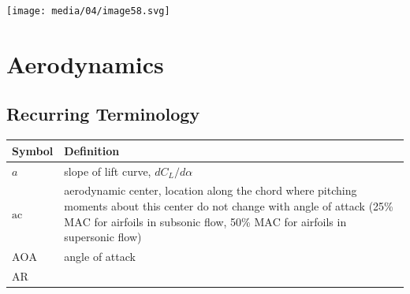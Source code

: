 \documentclass[
]{book}
\begin{document}
\texttt{[image: media/04/image58.svg]}

\hypertarget{aerodynamics}{%
\chapter{Aerodynamics}\label{aerodynamics}}

\hypertarget{recurring-terminology}{%
\section*{Recurring Terminology}\label{recurring-terminology}}

\begin{longtable}[]{@{}ll@{}}
\toprule
\begin{minipage}[b]{0.22\columnwidth}\raggedright
Symbol\strut
\end{minipage} & \begin{minipage}[b]{0.72\columnwidth}\raggedright
Definition\strut
\end{minipage}\tabularnewline
\midrule
\endhead
\begin{minipage}[t]{0.22\columnwidth}\raggedright
\(a\)\strut
\end{minipage} & \begin{minipage}[t]{0.72\columnwidth}\raggedright
slope of lift curve, \(dC_L/d\alpha\)\strut
\end{minipage}\tabularnewline
\begin{minipage}[t]{0.22\columnwidth}\raggedright
\(\mathrm{ac}\)\strut
\end{minipage} & \begin{minipage}[t]{0.72\columnwidth}\raggedright
aerodynamic center, location along the chord where pitching moments about this center do not change with angle of attack (25\% \(\mathrm{MAC}\) for airfoils in subsonic flow, 50\% \(\mathrm{MAC}\) for airfoils in supersonic flow)\strut
\end{minipage}\tabularnewline
\begin{minipage}[t]{0.22\columnwidth}\raggedright
\(\mathrm{AOA}\)\strut
\end{minipage} & \begin{minipage}[t]{0.72\columnwidth}\raggedright
angle of attack\strut
\end{minipage}\tabularnewline
\begin{minipage}[t]{0.22\columnwidth}\raggedright
\(\mathrm{AR}\)\strut
\end{minipage} & \begin{minipage}[t]{0.72\columnwidth}\raggedright

\end{minipage}
\end{longtable}
\end{document}
